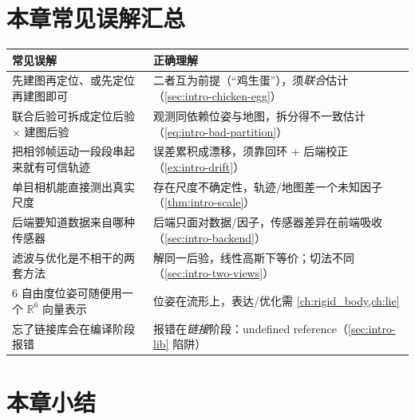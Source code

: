 \section*{本章常见误解汇总}
\begin{table}[H]\centering\small
\begin{tabular}{p{} p{}}
\toprule
\textbf{常见误解} & \textbf{正确理解} \\
\midrule
先建图再定位、或先定位再建图即可 & 二者互为前提（“鸡生蛋”），须\emph{联合}估计（\cref{sec:intro-chicken-egg}）\\
联合后验可拆成定位后验 $\times$ 建图后验 & 观测同依赖位姿与地图，拆分得不一致估计（\cref{eq:intro-bad-partition}）\\
把相邻帧运动一段段串起来就有可信轨迹 & 误差累积成漂移，须靠回环 + 后端校正（\cref{ex:intro-drift}）\\
单目相机能直接测出真实尺度 & 存在尺度不确定性，轨迹/地图差一个未知因子（\cref{thm:intro-scale}）\\
后端要知道数据来自哪种传感器 & 后端只面对数据/因子，传感器差异在前端吸收（\cref{sec:intro-backend}）\\
滤波与优化是不相干的两套方法 & 解同一后验，线性高斯下等价；切法不同（\cref{sec:intro-two-views}）\\
6 自由度位姿可随便用一个 $\mathbb{R}^6$ 向量表示 & 位姿在流形上，表达/优化需 \cref{ch:rigid_body,ch:lie}\\
忘了链接库会在编译阶段报错 & 报错在\emph{链接}阶段：undefined reference（\cref{sec:intro-lib} 陷阱）\\
\bottomrule
\end{tabular}
\end{table}

\section*{本章小结}

